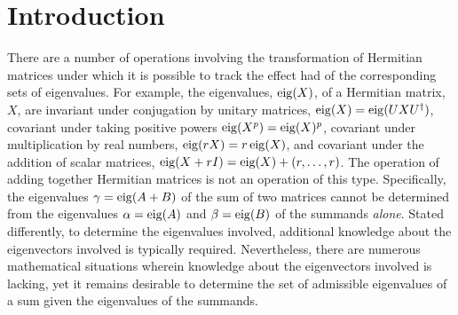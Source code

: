 \documentclass[notitlepage, 10pt]{article}
\begin{document}
\begin{abstract}
    Moreover, we provide a new elementary proof of an upper bound on the Hilbert-Schmidt norms of $6j$ operators using the Cauchy-Schwarz inequality.
    Combining this upper bound with estimates coming from the large $n\to\infty$ asymptotic limit, we obtain a new proof of a previously known submodular inequality involving unnormalized entropies of sums of positive semidefinite matrices.
    
    Finally, we show how it is posssible to embed positive semidefinite matrices and their sums into multipartite density matrices such that further generalizations of the tetrahedral Horn's problem can be viewed as a special case of the spectral quantum marginals problem.
    From this perspective, we obtain an alternative new proof of the aforementioned submodular unnormalized entropy inequality.
    Motivated by this connection to multipartite quantum states, we consider the set of possible allocations of unnormalized entropies of sums of positive semidefinite matrices and prove it forms a convex cone.
    This convex cone, which we call the additive quantum entropy cone, serves as an analogue of Pippenger's quantum entropy cone; indeed we prove that every balanced inequality that is valid for the quantum entropy cone is also valid for additive quantum entropy cone, thus extending an open conjecture of J. Cadney, N. Linden, and A. Winter.
\end{abstract}


\clearpage
\tableofcontents

\section{Introduction}

There are a number of operations involving the transformation of Hermitian matrices under which it is possible to track the effect had of the corresponding sets of eigenvalues.
For example, the eigenvalues, $\operatorname{eig}(X)$, of a Hermitian matrix, $X$, are invariant under conjugation by unitary matrices, $\operatorname{eig}(X) = \operatorname{eig}(UXU^{\dagger})$, covariant under taking positive powers $\operatorname{eig}(X^p) = \operatorname{eig}(X)^p$, covariant under multiplication by real numbers, $\operatorname{eig}(r X) = r \operatorname{eig}(X)$, and covariant under the addition of scalar matrices, $\operatorname{eig}(X+rI) = \operatorname{eig}(X) + (r,\ldots,r)$.
The operation of adding together Hermitian matrices is not an operation of this type.
Specifically, the eigenvalues $\gamma = \operatorname{eig}(A+B)$ of the sum of two matrices cannot be determined from the eigenvalues $\alpha = \operatorname{eig}(A)$ and $\beta = \operatorname{eig}(B)$ of the summands \textit{alone}.
Stated differently, to determine the eigenvalues involved, additional knowledge about the eigenvectors involved is typically required.
Nevertheless, there are numerous mathematical situations wherein knowledge about the eigenvectors involved is lacking, yet it remains desirable to determine the set of admissible eigenvalues of a sum given the eigenvalues of the summands.
\end{document}
